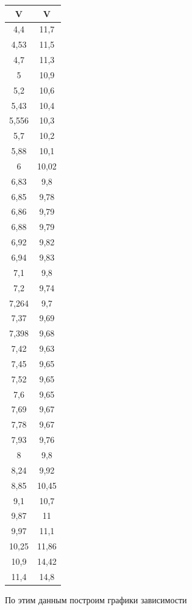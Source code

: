 \documentclass[a4paper,14pt]{extarticle}
\begin{document}
\begin{table}[h!]
\begin{tabular}{|c|c|}
	\end{tabular}
	\begin{tabular}{|c|c|}
		\hline
		V&V \\ \hline
		4,4	&	11,7	\\ \hline
4,53	&	11,5	\\ \hline
4,7	&	11,3	\\ \hline
5	&	10,9	\\ \hline
5,2	&	10,6	\\ \hline
5,43	&	10,4	\\ \hline
5,556	&	10,3	\\ \hline
5,7	&	10,2	\\ \hline
5,88	&	10,1	\\ \hline
6	&	10,02	\\ \hline
6,83	&	9,8	\\ \hline
6,85	&	9,78	\\ \hline
6,86	&	9,79	\\ \hline
6,88	&	9,79	\\ \hline
6,92	&	9,82	\\ \hline
6,94	&	9,83	\\ \hline
7,1	&	9,8	\\ \hline
7,2	&	9,74	\\ \hline
7,264	&	9,7	\\ \hline
7,37	&	9,69	\\ \hline
7,398	&	9,68	\\ \hline
7,42	&	9,63	\\ \hline
7,45	&	9,65	\\ \hline
7,52	&	9,65	\\ \hline
7,6	&	9,65	\\ \hline
7,69	&	9,67	\\ \hline
7,78	&	9,67	\\ \hline
7,93	&	9,76	\\ \hline
8	&	9,8	\\ \hline
8,24	&	9,92	\\ \hline
8,85	&	10,45	\\ \hline
9,1	&	10,7	\\ \hline
9,87	&	11	\\ \hline
9,97	&	11,1	\\ \hline
10,25	&	11,86	\\ \hline
10,9	&	14,42	\\ \hline
11,4	&	14,8	\\ \hline
	\end{tabular}
	\end{table}
	\clearpage
	По этим данным построим графики зависимости
\end{document}
